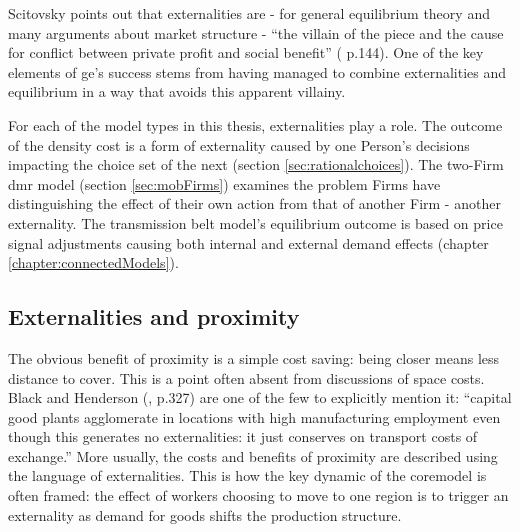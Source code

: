 {Scitovsky points out that externalities are - for general equilibrium theory and many arguments about market structure - ``the villain of the piece and the cause for conflict between private profit and social benefit'' (\citealt{scitovsky_two_1954} p.144). One of the key elements of \gls{ge}'s success stems from having managed to combine externalities and equilibrium in a way that avoids this apparent villainy.

For each of the model types in this thesis, externalities play a role. The outcome of the density cost is a form of externality caused by one Person's decisions impacting the choice set of the next (section \ref{sec:rationalchoices}). The two-Firm \gls{dmr} model (section \ref{sec:mobFirms}) examines the problem Firms have distinguishing the effect of their own action from that of another Firm - another externality. The transmission belt model's equilibrium outcome is based on price signal adjustments causing both internal and external demand effects (chapter \ref{chapter:connectedModels}). 

\subsection{Externalities and proximity \label{sec:externalitiesspace}}

The obvious benefit of proximity is a simple cost saving: being closer means less distance to cover. This is a point often absent from discussions of space costs. Black and Henderson (\citeyear{black_spatial_1999}, p.327) are one of the few to explicitly mention it: ``capital good plants agglomerate in locations with high manufacturing employment even though this generates no externalities: it just conserves on transport costs of exchange.'' More usually, the costs and benefits of proximity are described using the language of externalities. This is how the key dynamic of the \gls{coremodel} is often framed: the effect of workers choosing to move to one region is to trigger an externality as demand for goods shifts the production structure.

}
